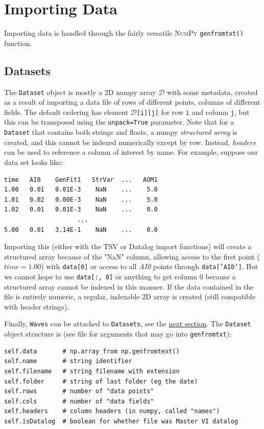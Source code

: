 \documentclass[10pt]{report}
\begin{document}
\chapter{Importing Data}\label{chap:data}
Importing data is handled through the fairly versatile \textsc{NumPy} \texttt{genfromtxt()} function. 

\section{Datasets}
The \texttt{Dataset} object is mostly a 2D numpy array $\mathcal{D}$ with some metadata, created as a result of importing a data file of rows of different points, columns of different fields. The default ordering has element $\mathcal{D}$\texttt{[i][j]} for row \texttt{i} and column \texttt{j}, but this can be transposed using the \texttt{unpack=True} parameter. Note that for a \texttt{Dataset} that contains both strings and floats, a numpy \textit{structured array} is created, and this cannot be indexed numerically except by row. Instead, \textit{headers} can be used to reference a column of interest by name. For example, suppose our data set looks like:
\begin{lstlisting}[caption=Example data contents of a .txt file]
time   AI0    GenFit1   StrVar  ...   AOM1
1.00   0.01   0.01E-3    NaN    ...    5.0
1.01   0.02   0.00E-3    NaN    ...    5.0
1.02   0.01   0.01E-3    NaN    ...    0.0
                    ...
5.00   0.01   3.14E-1    NaN    ...    0.0          
\end{lstlisting}
Importing this (either with the TSV or Datalog import functions) will create a structured array because of the "NaN" column, allowing access to the first point ($time=1.00$) with \texttt{data[0]} or access to all \textit{AI0} points through \texttt{data['AI0']}. But we cannot hope to use \texttt{data[:, 0]} or anything to get column 0 because a structured array cannot be indexed in this manner. If the data contained in the file is entirely numeric, a regular, indexable 2D array is created (still compatible with header strings).

Finally, \texttt{Waves} can be attached to \texttt{Datasets}, see the \hyperref[sec:attachwave]{next section}. The \texttt{Dataset} object structure is (see file for arguments that may go into \texttt{genfromtxt}):
\begin{lstlisting}[caption={Dataset structure}, style=properties]
self.data       # np.array from np.genfromtext()
self.name       # string identifier
self.filename   # string filename with extension
self.folder     # string of last folder (eg the date)
self.rows       # number of "data points"
self.cols       # number of "data fields"
self.headers    # column headers (in numpy, called "names")
self.isDatalog  # boolean for whether file was Master VI datalog
\end{lstlisting}
\end{document}
